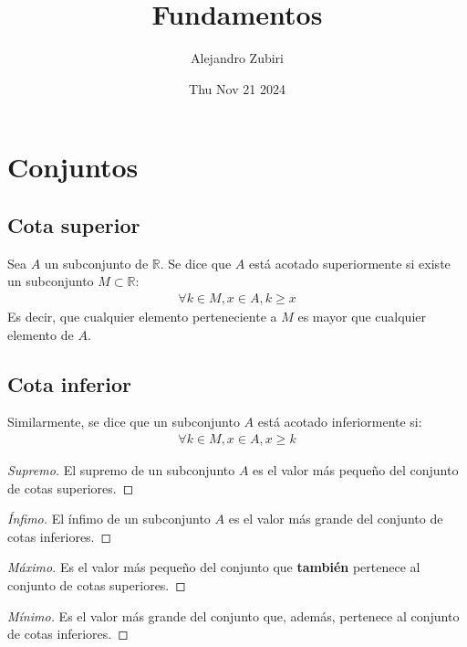 \documentclass{article}
\author{Alejandro Zubiri}
\date{Thu Nov 21 2024}
\title{Fundamentos}
\begin{document}
\maketitle
\tableofcontents
\pagebreak

\section{Conjuntos}
\subsection{Cota superior}
Sea $A$ un subconjunto de $\mathbb{R}$. Se dice que $A$ está acotado superiormente si existe un
subconjunto $M \subset \mathbb{R}:$
\begin{equation}
    \begin{split}
        \forall k \in M, x \in A, k \geq x
    \end{split}
\end{equation}
Es decir, que cualquier elemento perteneciente a $M$ es mayor que cualquier elemento de $A$.
\subsection{Cota inferior}
Similarmente, se dice que un subconjunto $A$ está acotado inferiormente si:
\begin{equation}
    \begin{split}
        \forall k \in M, x \in A, x \geq k
    \end{split}
\end{equation}
\begin{proof}[Supremo]
    El supremo de un subconjunto $A$ es el valor más pequeño del conjunto de cotas superiores.
\end{proof}
\begin{proof}[Ínfimo]
    El ínfimo de un subconjunto $A$ es el valor más grande del conjunto de cotas inferiores.
\end{proof}
\begin{proof}[Máximo]
    Es el valor más pequeño del conjunto que \textbf{también} pertenece al conjunto de
    cotas superiores.
\end{proof}
\begin{proof}[Mínimo]
    Es el valor más grande del conjunto que, además, pertenece al conjunto de cotas inferiores.
\end{proof}
\end{document}
